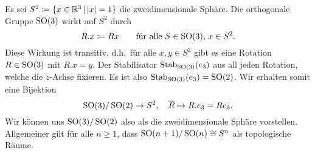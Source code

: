 \begin{remark}
  Es sei $S^2 \coloneqq \{ x \in \Real^3 \suchthat \abs{x} = 1 \}$ die zweidimensionale Sphäre.
  Die orthogonale Gruppe $\operatorname{SO}(3)$ wirkt auf $S^2$ durch
  \[
              R.x
    \coloneqq Rx
    \qquad
    \text{für alle $S \in \operatorname{SO}(3)$, $x \in S^2$}.
  \]
  Diese Wirkung ist transitiv, d.h.\ für alle $x, y \in S^2$ gibt es eine Rotation $R \in \operatorname{SO}(3)$ mit $R.x = y$.
  Der Stabilisator $\operatorname{Stab}_{\operatorname{SO}(3)}(e_3)$ aus all jeden Rotation, welche die $z$-Achse fixieren.
  Es ist also $\operatorname{Stab}_{\operatorname{SO}(3)}(e_3) = \operatorname{SO}(2)$.
  Wir erhalten somit eine Bijektion
  \[
            \operatorname{SO}(3)/\operatorname{SO}(2)
    \to     S^2,
    \quad   \overline{R}
    \mapsto R.e_3
    =       R e_3.
  \]
  Wir können uns $\operatorname{SO}(3)/\operatorname{SO}(2)$ also als die zweidimensionale Sphäre vorstellen.
  Allgemeiner gilt für alle $n \geq 1$, dass $\operatorname{SO}(n+1)/\operatorname{SO}(n) \cong S^n$ als topologische Räume.
\end{remark}





\subsection{}

